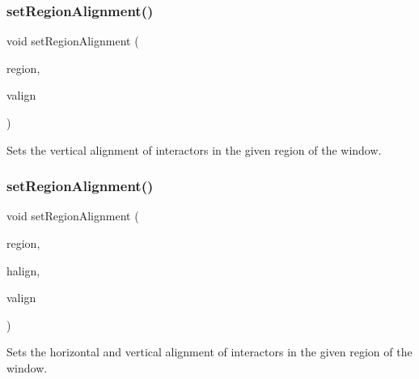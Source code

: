 \subsubsection{\texorpdfstring{set\+Region\+Alignment()}{setRegionAlignment()}\hspace{0.1cm}{\footnotesize\ttfamily [2/5]}}
{\footnotesize\ttfamily void set\+Region\+Alignment (\begin{DoxyParamCaption}\item[{\mbox{\hyperlink{classGWindow_a81a01a86de31071a92e6cce0bab9bc4b}{Region}}}]{region,  }\item[{Vertical\+Alignment}]{valign }\end{DoxyParamCaption})\hspace{0.3cm}{\ttfamily [virtual]}}



Sets the vertical alignment of interactors in the given region of the window. 

\mbox{\label{classGWindow_ab4d2bfcca7a18da2847e7b4494da4a16}} 
\subsubsection{\texorpdfstring{set\+Region\+Alignment()}{setRegionAlignment()}\hspace{0.1cm}{\footnotesize\ttfamily [3/5]}}
{\footnotesize\ttfamily void set\+Region\+Alignment (\begin{DoxyParamCaption}\item[{\mbox{\hyperlink{classGWindow_a81a01a86de31071a92e6cce0bab9bc4b}{Region}}}]{region,  }\item[{Horizontal\+Alignment}]{halign,  }\item[{Vertical\+Alignment}]{valign }\end{DoxyParamCaption})\hspace{0.3cm}{\ttfamily [virtual]}}



Sets the horizontal and vertical alignment of interactors in the given region of the window. 

\mbox{\label{classGWindow_ae4ff46516be9472498c0bf058b496e8b}} 
